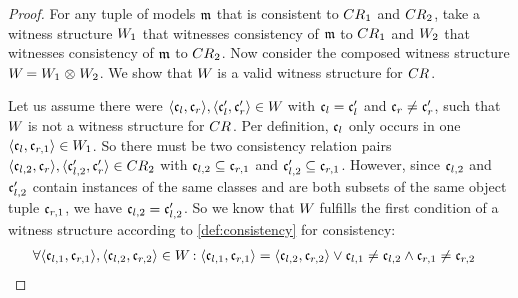 \begin{proof}
    For any tuple of models $\modeltuple{m}$ that is consistent to $\consistencyrelation{CR}{1}$ and $\consistencyrelation{CR}{2}$, take a witness structure $\consistencyrelation{W}{1}$ that witnesses consistency of $\modeltuple{m}$ to $\consistencyrelation{CR}{1}$ and $\consistencyrelation{W}{2}$ that witnesses consistency of $\modeltuple{m}$ to $\consistencyrelation{CR}{2}$.
    Now consider the composed witness structure $\consistencyrelation{W}{} = \consistencyrelation{W}{1} \concat \consistencyrelation{W}{2}$.
    We show that $\consistencyrelation{W}{}$ is a valid witness structure for $\consistencyrelation{CR}{}$.

    Let us assume there were $\tupled{\conditionelement{c}{l}, \conditionelement{c}{r}}, \tupled{\conditionelement{c}{l}', \conditionelement{c}{r}'} \in \consistencyrelation{W}{}$ with $\conditionelement{c}{l} = \conditionelement{c}{l}'$ and $\conditionelement{c}{r} \neq \conditionelement{c}{r}'$, such that $\consistencyrelation{W}{}$ is not a witness structure for $\consistencyrelation{CR}{}$.
    Per definition, $\conditionelement{c}{l}$ only occurs in one $\tupled{\conditionelement{c}{l}, \conditionelement{c}{r,1}} \in \consistencyrelation{W}{1}$.
    So there must be two consistency relation pairs $\tupled{\conditionelement{c}{l,2}, \conditionelement{c}{r}}, \tupled{\conditionelement{c}{l,2}', \conditionelement{c}{r}'} \in \consistencyrelation{CR}{2}$ with $\conditionelement{c}{l,2} \subseteq \conditionelement{c}{r,1}$ and $\conditionelement{c}{l,2}' \subseteq \conditionelement{c}{r,1}$.
    However, since $\conditionelement{c}{l,2}$ and $\conditionelement{c}{l,2}'$ contain instances of the same classes and are both subsets of the same object tuple $\conditionelement{c}{r,1}$, we have $\conditionelement{c}{l,2} = \conditionelement{c}{l,2}'$.
    So we know that $\consistencyrelation{W}{}$ fulfills the first condition of a witness structure according to \autoref{def:consistency} for consistency:
    \begin{align*}
        &
        \forall \tupled{\conditionelement{c}{l,1}, \conditionelement{c}{r,1}}, \tupled{\conditionelement{c}{l,2}, \conditionelement{c}{r,2}} \in \consistencyrelation{W}{} : 
        \tupled{\conditionelement{c}{l,1}, \conditionelement{c}{r,1}} = \tupled{\conditionelement{c}{l,2}, \conditionelement{c}{r,2}} \lor \conditionelement{c}{l,1} \neq \conditionelement{c}{l,2} \land \conditionelement{c}{r,1} \neq \conditionelement{c}{r,2}
    \end{align*}

\end{proof}
